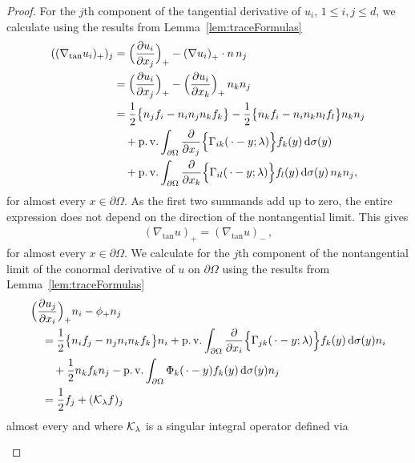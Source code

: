 \begin{proof}
  For the $j$th component of the tangential derivative of $u_i$, $1\leq i,j \leq d$, we calculate using the results from Lemma~\ref{lem:traceFormulas}
  \begin{align*}
    ((\nabla_{\mathrm{tan}} u_i)_+)_j
    &= \Big(\frac{\partial u_i}{\partial x_j}\Big)_+ - (\nabla u_i)^{}_+ \cdot  n \, n_j \\
    &= \Big(\frac{\partial u_i}{\partial x_j} \Big)_+ - \Big(\frac{\partial u_i}{\partial x_k} \Big)_+\, n_k n_j \\
    &= \frac{1}{2} \big\{ n_j f_i - n_i n_j n_k f_k\big\} - \frac{1}{2} \big\{ n_k f_i - n_i n_k n_l f_l \big\} n_k n_j  \\
    &\quad+ \operatorname{p. v.} \int_{\partial\Omega} \frac{\partial}{\partial x_j} \Big\{ \Gamma_{ik} (\,\cdot - y; \lambda) \Big\} f_k(y) \, {\operatorname{d}\!{\sigma}}(y) \\
    &\quad+ \operatorname{p. v.} \int_{\partial\Omega} \frac{\partial}{\partial x_k} \Big\{ \Gamma_{il} (\,\cdot - y; \lambda) \Big\} f_l(y) \, {\operatorname{d}\!{\sigma}}(y) \, n_k n_j,
  \end{align*}
  for almost every $x \in \partial\Omega$.
  As the first two summands add up to zero, the entire expression does not depend on the direction of the nontangential limit. 
  This gives
  \begin{align*}
    (\nabla_{\mathrm{tan}} u)_+ = (\nabla_{\mathrm{tan}} u)_-\,,
  \end{align*}
  for almost every $x \in \partial\Omega$.
  We calculate for the $j$th component of the nontangential limit of the conormal derivative of $u$ on $\partial\Omega$ using the results from Lemma~\ref{lem:traceFormulas}
  \begin{align*}
    &\Big(\frac{\partial u_j}{\partial x_i}\Big)_+ n_i - \phi_+ n_j\\
    &\quad= \frac{1}{2} \big\{ n_i f_j - n_j n_i n_k f_k \big\} n_i + \operatorname{p. v.} \int_{\partial\Omega} \frac{\partial}{\partial{x_i}} \Big\{ \Gamma_{jk}(\,\cdot - y; \lambda) \Big\} f_k(y) \, {\operatorname{d}\!{\sigma}}(y) n_i \\
    &\qquad+ \frac{1}{2} n_k f_k n_j - \operatorname{p. v.} \int_{\partial\Omega} \Phi_k(\,\cdot - y) f_k(y) \, {\operatorname{d}\!{\sigma}}(y) n_j \\
    &\quad= \frac{1}{2} f_j + (\mathcal{K}_\lambda f)_j
  \end{align*}
  almost every and where $\mathcal{K}_\lambda$ is a singular integral operator defined via
  \begin{align}
    \label{eq:defnKlambda}
    \begin{alignedat}{1}

\end{alignedat}
\end{align}
\end{proof}
